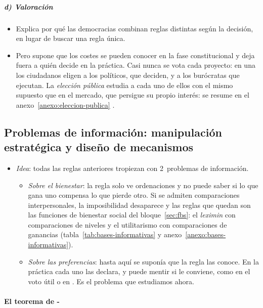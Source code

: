 \documentclass[11pt]{article}
\begin{document}
\subparagraph{d) Valoración}

\begin{itemize}
\item Explica por qué las democracias combinan reglas distintas según la decisión, en lugar de buscar una regla única.
\item Pero supone que los costes se pueden conocer en la fase constitucional y deja fuera a quién decide en la práctica. Casi nunca se vota cada proyecto: en una  los ciudadanos eligen a los políticos, que deciden, y a los burócratas que ejecutan. La \emph{elección pública} estudia a cada uno de ellos con el mismo supuesto que en el mercado, que persigue su propio interés: se resume en el anexo~\ref{anexo:eleccion-publica}  .
\end{itemize}

\subsection{Problemas de información: manipulación estratégica y diseño de mecanismos}\label{sec:informacion}

\begin{itemize}
\item \emph{Idea}: todas las reglas anteriores tropiezan con 2~problemas de información.
  \begin{itemize}
  \item \emph{Sobre el bienestar}: la regla solo ve ordenaciones y no puede saber si lo que gana uno compensa lo que pierde otro. Si se admiten comparaciones interpersonales, la imposibilidad desaparece y las reglas que quedan son las funciones de bienestar social del bloque~\ref{sec:fbs}: el \emph{leximin} con comparaciones de niveles\nocite{Hammond1976Equity} y el utilitarismo con comparaciones de ganancias\nocite{dAspremontGevers1977Equity} (tabla~\ref{tab:bases-informativas} y anexo~\ref{anexo:bases-informativas}).
  \item \emph{Sobre las preferencias}: hasta aquí se suponía que la regla las conoce. En la práctica cada uno las declara, y puede mentir si le conviene, como en el voto útil o en . Es el problema que estudiamos ahora.
  \end{itemize}
\end{itemize}

\paragraph{El teorema de -}
\end{document}
